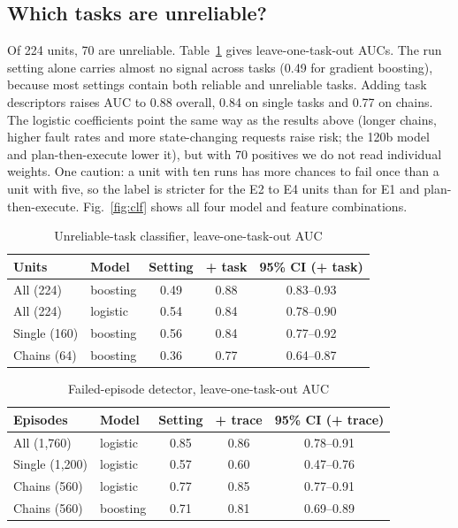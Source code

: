 \documentclass[10pt,a4paper,twocolumn]{article}
\begin{document}
\subsection{Which tasks are unreliable?}
Of 224 units, 70 are unreliable. Table~\ref{tab:clf} gives leave-one-task-out AUCs. The run setting alone carries almost
no signal across tasks (0.49 for gradient boosting), because most settings contain both reliable and unreliable tasks.
Adding task descriptors raises AUC to 0.88 overall, 0.84 on single tasks and 0.77 on chains. The logistic coefficients
point the same way as the results above (longer chains, higher fault rates and more state-changing requests raise risk;
the 120b model and plan-then-execute lower it), but with 70 positives we do not read individual weights. One caution:
a unit with ten runs has more chances to fail once than a unit with five, so the label is stricter for the E2 to E4
units than for E1 and plan-then-execute. Fig.~\ref{fig:clf} shows all four model and feature combinations.

\begin{table}[t]
\caption{Unreliable-task classifier, leave-one-task-out AUC}\label{tab:clf}
\centering\small
\begin{tabular}{@{}llccc@{}}
\toprule
Units & Model & Setting & + task & 95\% CI (+ task)\\
\midrule
All (224) & boosting & 0.49 & 0.88 & 0.83--0.93\\
All (224) & logistic & 0.54 & 0.84 & 0.78--0.90\\
Single (160) & boosting & 0.56 & 0.84 & 0.77--0.92\\
Chains (64) & boosting & 0.36 & 0.77 & 0.64--0.87\\
\bottomrule
\end{tabular}
\end{table}

\begin{table}[t]
\caption{Failed-episode detector, leave-one-task-out AUC}\label{tab:det}
\centering\small
\begin{tabular}{@{}llccc@{}}
\toprule
Episodes & Model & Setting & + trace & 95\% CI (+ trace)\\
\midrule
All (1,760) & logistic & 0.85 & 0.86 & 0.78--0.91\\
Single (1,200) & logistic & 0.57 & 0.60 & 0.47--0.76\\
Chains (560) & logistic & 0.77 & 0.85 & 0.77--0.91\\
Chains (560) & boosting & 0.71 & 0.81 & 0.69--0.89\\
\bottomrule
\end{tabular}
\end{table}
\end{document}
